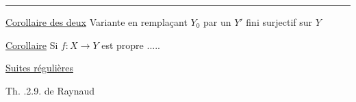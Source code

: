 \noindent\rule{.7\linewidth}{.3pt}

\uline{Corollaire des deux} Variante en remplaçant $Y_0$ par un $Y'$ fini surjectif sur $Y$

\uline{Corollaire} Si $f:X\to Y$ est  propre .....



\uline{Suites régulières}

Th. .2.9. de Raynaud


